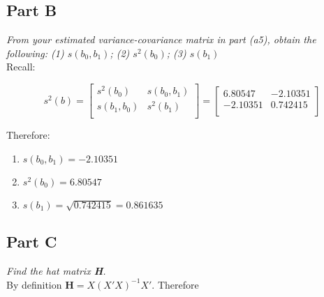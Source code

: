 \documentclass[12pt, letterpaper]{article}
\begin{document}
\subsection{Part B}
\textit{From your estimated variance-covariance matrix in part (a5), obtain the following: (1) $s(b_{0},b_{1})$; (2) $s^{2}(b_{0})$; (3) $s(b_{1})$} \\

Recall:

$$ s^{2}(b)= \begin{bmatrix}
s^{2}(b_{0}) & s(b_0, b_1) \\
s(b_1, b_0) & s^2(b_1) \\
\end{bmatrix} = \begin{bmatrix}
 6.80547 & -2.10351 \\
 -2.10351 & 0.742415 \\
 \end{bmatrix}
$$

Therefore: 
\begin{enumerate}
\item $s(b_{0}, b_{1}) = -2.10351$
\item $s^{2}(b_{0}) = 6.80547$
\item $s(b_{1}) = \sqrt{0.742415} = 0.861635$
\end{enumerate}

\subsection{Part C}
\textit{Find the hat matrix \textbf{H}.} \\

By definition $\textbf{H} = X(X'X)^{-1}X'$. Therefore 
\end{document}
